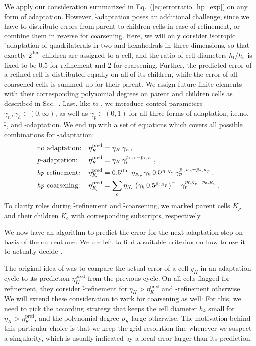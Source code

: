 We apply our consideration summarized in Eq.~(\ref{eq:errorratio_hp_exp}) on any form of adaptation. However, \h-adaptation poses an additional challenge, since we have to distribute errors from parent to children cells in case of refinement, or combine them in reverse for coarsening. Here, we will only consider isotropic \h-adaptation of quadrilaterals in two and hexahedrals in three dimensions, so that exactly $2^\text{dim}$ children are assigned to a cell, and the ratio of cell diameters $h_\text{f} / h_\text{a}$ is fixed to be $0.5$ for refinement and $2$ for coarsening. Further, the predicted error of a refined cell is distributed equally on all of its children, while the error of all coarsened cells is summed up for their parent. We assign future finite elements with their corresponding polynomial degrees on parent and children cells as described in Sec.~. Last, like to \textcite{melenk2001}, we introduce control parameters $\gamma_n, \gamma_h \in (0, \infty)$, as well as $\gamma_p \in (0,1)$ for all three forms of adaptation, i.e.\@ no, \h-, and \p-adaptation. We end up with a set of equations which covers all possible combinations for \hp-adaptation:
\begin{align}
&\text{no adaptation:} & \eta^\text{pred}_K &= \eta_K \, \gamma_n \,\text{,} \\
&\text{\textit{p}-adaptation:} & \eta^\text{pred}_K &= \eta_K \, \gamma_p^{p_{\text{f},K} - p_{\text{a},K}} \,\text{,} \\
&\text{\textit{hp}-refinement:} &\eta^\text{pred}_{K_c} &= 0.5^{\text{dim}} \, \eta_{K_p} \, \gamma_h \, 0.5^{p_{\text{f},K_c}} \, \gamma_p^{p_{\text{f},K_c} - p_{\text{a},K_p}} \,\text{,} \\
&\text{\textit{hp}-coarsening:} & \eta^\text{pred}_{K_p} &= \sum\limits_{c} \eta_{K_c} \left( \gamma_h \, 0.5^{p_{\text{f},K_p}} \right)^{-1} \, \gamma_p^{p_{\text{f},K_p} - p_{\text{a},K_c}} \,\text{.} 
\end{align}
To clarify roles during \h-refinement and \h-coarsening, we marked parent cells $K_p$ and their children $K_c$ with corresponding subscripts, respectively.

We now have an algorithm to predict the error for the next adaptation step on basis of the current one. We are left to find a suitable criterion on how to use it to actually decide .

The original idea of \cite{melenk2001} was to compare the actual error of a cell $\eta_K$ in an adaptation cycle to its prediction $\eta_K^\text{pred}$ from the previous cycle. On all cells flagged for refinement, they consider \h-refinement for $\eta_K > \eta_K^\text{pred}$ and \p-refinement otherwise. We will extend these consideration to work for coarsening as well: For this, we need to pick the according strategy that keeps the cell diameter $h_k$ small for $\eta_K > \eta_K^\text{pred}$, and the polynomial degree $p_K$ large otherwise. The motivation behind this particular choice is that we keep the grid resolution fine whenever we suspect a singularity, which is usually indicated by a local error larger than its prediction.

